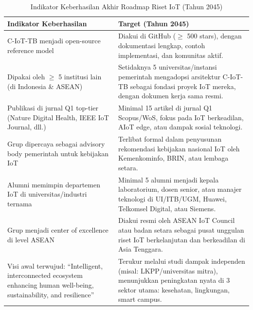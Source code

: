 \documentclass[11pt,a4paper]{article}
\begin{document}
\begin{table}
    \centering
    \caption{Indikator Keberhasilan Akhir Roadmap Riset IoT (Tahun 2045)}
    \label{tab:final-kpi}
    \footnotesize %
    \setlength{\tabcolsep}{3pt} %
    \renewcommand{\arraystretch}{0.9} %
    \begin{tabular}{lp{7.5cm}}
        \toprule
        \textbf{Indikator Keberhasilan}                                                                                        & \textbf{Target (Tahun 2045)}                                                                                                                                   \\
        \midrule
        C-IoT-TB menjadi open-source reference model                                                                           & Diakui di GitHub ($\geq$ 500 stars), dengan dokumentasi lengkap, contoh implementasi, dan komunitas aktif.                                                     \\
        Dipakai oleh $\geq$ 5 institusi lain (di Indonesia \& ASEAN)                                                           & Setidaknya 5 universitas/instansi pemerintah mengadopsi arsitektur C-IoT-TB sebagai fondasi proyek IoT mereka, dengan dokumen kerja sama resmi.                \\
        Publikasi di jurnal Q1 top-tier (Nature Digital Health, IEEE IoT Journal, dll.)                                        & Minimal 15 artikel di jurnal Q1 Scopus/WoS, fokus pada IoT berkeadilan, AIoT edge, atau dampak sosial teknologi.                                               \\
        Grup dipercaya sebagai advisory body pemerintah untuk kebijakan IoT                                                    & Terlibat formal dalam penyusunan rekomendasi kebijakan nasional IoT oleh Kemenkominfo, BRIN, atau lembaga setara.                                              \\
        Alumni memimpin departemen IoT di universitas/industri ternama                                                         & Minimal 5 alumni menjadi kepala laboratorium, dosen senior, atau manajer teknologi di UI/ITB/UGM, Huawei, Telkomsel Digital, atau Siemens.                     \\
        Grup menjadi center of excellence di level ASEAN                                                                       & Diakui resmi oleh ASEAN IoT Council atau badan setara sebagai pusat unggulan riset IoT berkelanjutan dan berkeadilan di Asia Tenggara.                         \\
        Visi awal terwujud: “Intelligent, interconnected ecosystem enhancing human well-being, sustainability, and resilience” & Terukur melalui studi dampak independen (misal: LKPP/universitas mitra), menunjukkan peningkatan nyata di 3 sektor utama: kesehatan, lingkungan, smart campus. \\
        \bottomrule
    \end{tabular}
\end{table}
\end{document}
